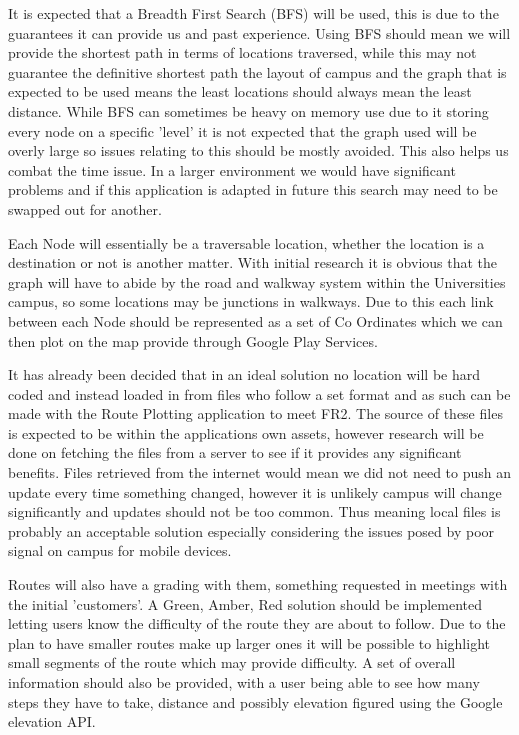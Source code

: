 It is expected that a Breadth First Search (BFS)\cite{bfs} will be used, this is due to the guarantees it can provide us and past experience. Using BFS should mean we will provide the shortest path in terms of locations traversed, while this may not guarantee the definitive shortest path the layout of campus and the graph that is expected to be used means the least locations should always mean the least distance. While BFS can sometimes be heavy on memory use due to it storing every node on a specific 'level' it is not expected that the graph used will be overly large so issues relating to this should be mostly avoided. This also helps us combat the time issue. In a larger environment we would have significant problems and if this application is adapted in future this search may need to be swapped out for another.

Each Node will essentially be a traversable location, whether the location is a destination or not is another matter. With initial research it is obvious that the graph will have to abide by the road and walkway system within the Universities campus, so some locations may be junctions in walkways. Due to this each link between each Node should be represented as a set of Co Ordinates which we can then plot on the map provide through Google Play Services. 

It has already been decided that in an ideal solution no location will be hard coded and instead loaded in from files who follow a set format and as such can be made with the Route Plotting application to meet FR2. The source of these files is expected to be within the applications own assets, however research will be done on fetching the files from a server to see if it provides any significant benefits. Files retrieved from the internet would mean we did not need to push an update every time something changed, however it is unlikely campus will change significantly and updates should not be too common. Thus meaning local files is probably an acceptable solution especially considering the issues posed by poor signal on campus for mobile devices. 

Routes will also have a grading with them, something requested in meetings with the initial 'customers'. A Green, Amber, Red solution should be implemented letting users know the difficulty of the route they are about to follow. Due to the plan to have smaller routes make up larger ones it will be possible to highlight small segments of the route which may provide difficulty. A set of overall information should also be provided, with a user being able to see how many steps they have to take, distance and possibly elevation figured using the Google elevation API\cite{ele}. 


